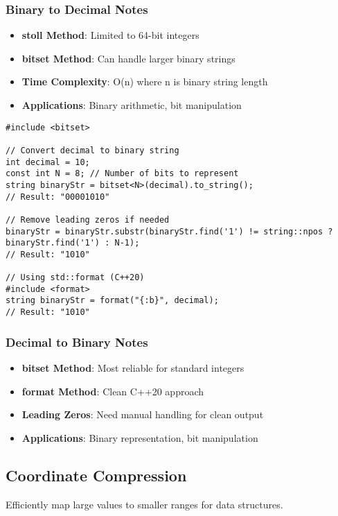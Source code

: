 \documentclass[11pt,a4paper]{article}
\begin{document}
\subsubsection*{Binary to Decimal Notes}
\begin{itemize}
\item \textbf{stoll Method}: Limited to 64-bit integers
\item \textbf{bitset Method}: Can handle larger binary strings
\item \textbf{Time Complexity}: O(n) where n is binary string length
\item \textbf{Applications}: Binary arithmetic, bit manipulation
\end{itemize}

\begin{lstlisting}[caption={Decimal to Binary Conversion}]
#include <bitset>

// Convert decimal to binary string
int decimal = 10;
const int N = 8; // Number of bits to represent
string binaryStr = bitset<N>(decimal).to_string();
// Result: "00001010"

// Remove leading zeros if needed
binaryStr = binaryStr.substr(binaryStr.find('1') != string::npos ? binaryStr.find('1') : N-1);
// Result: "1010"

// Using std::format (C++20)
#include <format>
string binaryStr = format("{:b}", decimal);
// Result: "1010"
\end{lstlisting}

\subsubsection*{Decimal to Binary Notes}
\begin{itemize}
\item \textbf{bitset Method}: Most reliable for standard integers
\item \textbf{format Method}: Clean C++20 approach
\item \textbf{Leading Zeros}: Need manual handling for clean output
\item \textbf{Applications}: Binary representation, bit manipulation
\end{itemize}

\newpage

\subsection{Coordinate Compression}
Efficiently map large values to smaller ranges for data structures.
\end{document}
